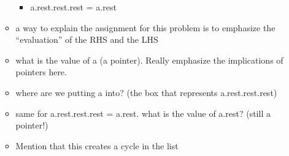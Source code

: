\begin{guide}
\begin{itemize}
\begin{itemize}
\begin{itemize}
            \item a.rest.rest.rest = a.rest
       \end{itemize}
       \item a way to explain the assignment for this problem is to emphasize the “evaluation” of the RHS and the LHS
       \item what is the value of a (a pointer). Really emphasize the implications of pointers here.        
       \item where are we putting a into? (the box that represents a.rest.rest.rest)
       \item same for a.rest.rest.rest = a.rest. what is the value of a.rest? (still a pointer!)
       \item Mention that this creates a cycle in the list
   \end{itemize}
   \end{itemize}
\end{guide}